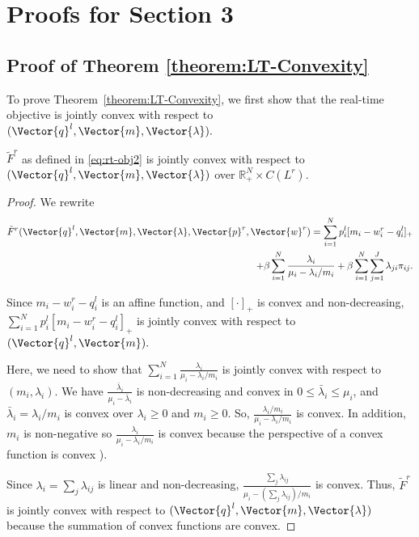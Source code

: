 \appendix

\section{Proofs for Section 3}

\subsection{Proof of Theorem \ref{theorem:LT-Convexity}}
\label{proof:convexity}

To prove Theorem~\ref{theorem:LT-Convexity}, we first show that the
real-time objective is jointly convex with respect to
$(\Vector{q}^l,\Vector{m},\Vector{\lambda}).$
\begin{lemma}
	\label{lemma:rt-convex}
	$\tilde{F}^r$ as defined in \eqref{eq:rt-obj2} is jointly
        convex with respect to
        $(\Vector{q}^l,\Vector{m},\Vector{\lambda})$ over
        $\mathbb{R}^N_+ \times C(L^r).$
\end{lemma}
\begin{proof}
	We rewrite
	\begin{eqnarray}
          \tilde{F}^r(\Vector{q}^l,\Vector{m},\Vector{\lambda},\Vector{p}^r,\Vector{w}^r) = \sum_{i=1}^{N} p^l_i [m_i-w^r_i-q^l_i]_+ \nonumber \\
          + \beta \sum_{i=1}^{N} \frac{\lambda_i}{\mu_i - \lambda_i/m_i} + \beta \sum_{i=1}^{N}\sum_{j=1}^{J} \lambda_{ji} \pi_{ij}.
	\end{eqnarray}
	
	
	Since $m_i-w^r_i-q^l_i$ is an affine function, and $[\cdot]_+$
        is convex and non-decreasing, $\sum_{i=1}^{N} p^l_i
        [m_i-w^r_i-q^l_i]_+$ is jointly convex with respect to
        $(\Vector{q}^l,\Vector{m}).$
	
	Here, we need to show that
        $\sum_{i=1}^{N}\frac{\lambda_i}{\mu_i - \lambda_i/m_i}$ is
        jointly convex with respect to $(m_i,\lambda_i).$ We have
        $\frac{\bar{\lambda}_i}{\mu_i - \bar{\lambda}_i}$ is
        non-decreasing and convex in $0 \leq \bar{\lambda}_i \leq
        \mu_i$, and $\bar{\lambda}_i=\lambda_i/m_i$ is convex over
        $\lambda_i \geq 0$ and $m_i \geq 0$. So,
        $\frac{\lambda_i/m_i}{\mu_i - \lambda_i/m_i}$ is convex. In
        addition, $m_i$ is non-negative so $\frac{\lambda_i}{\mu_i -
          \lambda_i/m_i}$ is convex because the perspective of a
        convex function is convex \cite{boyd2004convex}).
	
	Since $\lambda_i = \sum_{j}^{} \lambda_{ij}$ is linear and
        non-decreasing, $\frac{\sum_{j}^{} \lambda_{ij}}{\mu_i -
          (\sum_{j}^{} \lambda_{ij})/m_i}$ is convex. Thus,
        $\tilde{F}^r$ is jointly convex with respect to
        $(\Vector{q}^l,\Vector{m},\Vector{\lambda})$ because the
        summation of convex functions are convex.
\end{proof}

